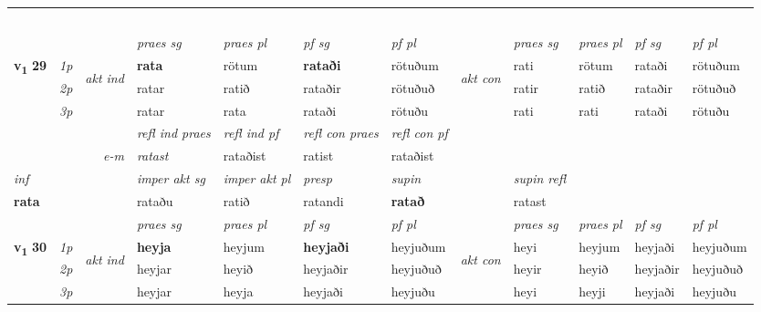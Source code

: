 \begin{longtable}[l]{X>{\footnotesize\itshape}llXXXXlXXXX}
\midrule
& \\*
& \\*
& \\*
& \\*
& \\
\midrule
 & &   & \textit{praes sg}  & \textit{praes pl}    & \textit{ pf sg} & \textit{pf pl} & & \textit{praes sg}  & \textit{praes pl}    & \textit{pf sg} & \textit{pf pl }  \\ \cmidrule{4-7} \cmidrule{9-12}
 \multirow{2}{*}{{{\textbf{v{\textsubscript{1}}} \Large{\textbf{29}}}}}  & 1p & \multirow{3}{*}{\begin{turn}{90}\textit{akt ind}\end{turn}} & \textbf{rata} & rötum & \textbf{rataði} & rötuðum & \multirow{3}{*}{\begin{turn}{90}\textit{akt con}\end{turn}} &rati & rötum & rataði & rötuðum\\*
 & 2p &  &  ratar  & ratið & rataðir & rötuðuð & & ratir & ratið & rataðir & rötuðuð \\*
 & 3p &  & ratar & rata & rataði & rötuðu & & rati & rati& rataði & rötuðu \\*
\cmidrule{4-7} \cmidrule{9-12}

 & && \textit{refl ind praes} & \textit{refl ind pf} & \textit{refl con praes} & \textit{refl con pf} \\*
\multicolumn{3}{r}{\textit{e-m}}& ratast & rataðist & ratist & rataðist \\*

\cmidrule{4-7}
   {\textit{inf}} & &  & \textit{imper akt sg} & \textit{imper akt pl}   & \textit{presp} & \textit{supin} && \textit{supin refl}  \\*
  {\textbf{rata}} & && rataðu  & ratið   & ratandi &  \textbf{ratað} && ratast  \\*

\midrule

 & &   & \textit{praes sg}  & \textit{praes pl}    & \textit{ pf sg} & \textit{pf pl} & & \textit{praes sg}  & \textit{praes pl}    & \textit{pf sg} & \textit{pf pl }  \\ \cmidrule{4-7} \cmidrule{9-12}
 \multirow{2}{*}{{{\textbf{v{\textsubscript{1}}} \Large{\textbf{30}}}}}  & 1p & \multirow{3}{*}{\begin{turn}{90}\textit{akt ind}\end{turn}} & \textbf{heyja} & heyjum & \textbf{heyjaði} & heyjuðum & \multirow{3}{*}{\begin{turn}{90}\textit{akt con}\end{turn}} &heyi & heyjum & heyjaði & heyjuðum\\*
 & 2p &  &  heyjar  & heyið & heyjaðir & heyjuðuð & & heyir & heyið & heyjaðir & heyjuðuð \\*
 & 3p &  & heyjar & heyja & heyjaði & heyjuðu & & heyi & heyji& heyjaði & heyjuðu \\*
\cmidrule{4-7} \cmidrule{9-12}


\end{longtable}
